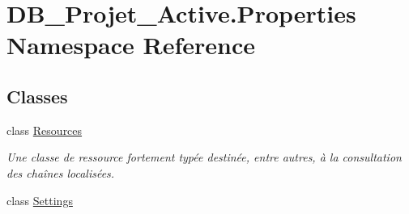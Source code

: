 \hypertarget{namespace_d_b___projet___active_1_1_properties}{}\section{D\+B\+\_\+\+Projet\+\_\+\+Active.\+Properties Namespace Reference}
\label{namespace_d_b___projet___active_1_1_properties}
\subsection*{Classes}
\begin{DoxyCompactItemize}
\item 
class \mbox{\hyperlink{class_d_b___projet___active_1_1_properties_1_1_resources}{Resources}}
\begin{DoxyCompactList}\small\item\em Une classe de ressource fortement typée destinée, entre autres, à la consultation des chaînes localisées. \end{DoxyCompactList}\item 
class \mbox{\hyperlink{class_d_b___projet___active_1_1_properties_1_1_settings}{Settings}}
\end{DoxyCompactItemize}
